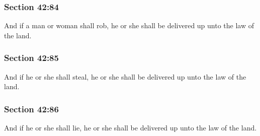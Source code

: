 	\subsubsection{Section 42:84} %
		\label{DC42-84}

		And if a man or woman shall rob, he or she shall be delivered up unto the law of the land.


	\subsubsection{Section 42:85} %
		\label{DC42-85}

		And if he or she shall steal, he or she shall be delivered up unto the law of the land.


	\subsubsection{Section 42:86} %
		\label{DC42-86}

		And if he or she shall lie, he or she shall be delivered up unto the law of the land.


